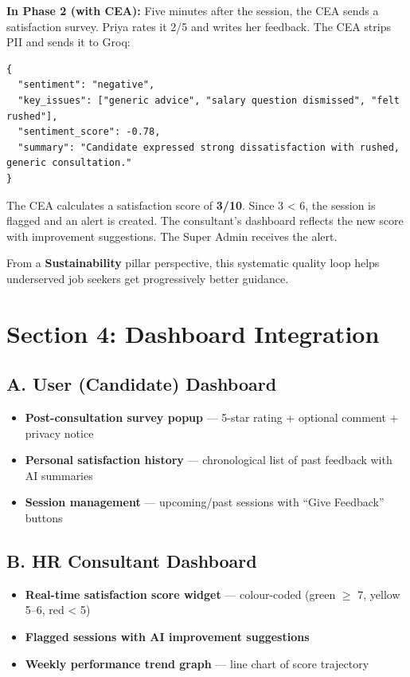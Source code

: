 \documentclass[11pt, a4paper]{article}
\begin{document}
\textbf{In Phase 2 (with CEA):} Five minutes after the session, the CEA sends a satisfaction survey. Priya rates it 2/5 and writes her feedback. The CEA strips PII and sends it to Groq:

\begin{lstlisting}
{
  "sentiment": "negative",
  "key_issues": ["generic advice", "salary question dismissed", "felt rushed"],
  "sentiment_score": -0.78,
  "summary": "Candidate expressed strong dissatisfaction with rushed, generic consultation."
}
\end{lstlisting}

The CEA calculates a satisfaction score of \textbf{3/10}. Since 3 < 6, the session is flagged and an alert is created. The consultant's dashboard reflects the new score with improvement suggestions. The Super Admin receives the alert.

From a \textbf{Sustainability} pillar perspective, this systematic quality loop helps underserved job seekers get progressively better guidance.

\section{Section 4: Dashboard Integration}

\subsection{A. User (Candidate) Dashboard}

\begin{itemize}[leftmargin=2em]
\item \textbf{Post-consultation survey popup} — 5-star rating + optional comment + privacy notice
\item \textbf{Personal satisfaction history} — chronological list of past feedback with AI summaries
\item \textbf{Session management} — upcoming/past sessions with ``Give Feedback'' buttons
\end{itemize}

\subsection{B. HR Consultant Dashboard}

\begin{itemize}[leftmargin=2em]
\item \textbf{Real-time satisfaction score widget} — colour-coded (green $\geq$ 7, yellow 5--6, red < 5)
\item \textbf{Flagged sessions with AI improvement suggestions}
\item \textbf{Weekly performance trend graph} — line chart of score trajectory
\end{itemize}
\end{document}

